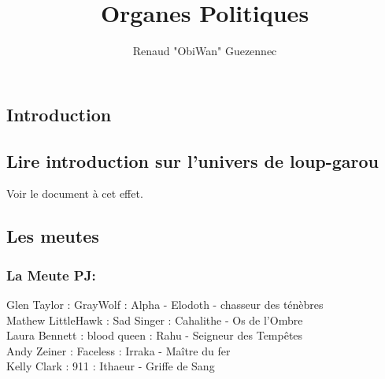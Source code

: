 \documentclass[oneside,12pt]{book}
\title{Organes Politiques}
\author{Renaud "ObiWan" Guezennec}
\date{}
\begin{document}
\maketitle \clearpage
\tableofcontents \clearpage

\begin{flushleft}
    \chapter{Introduction}
        \section{Lire introduction sur l'univers de loup-garou}
       Voir le document à cet effet.

\section{Les meutes}
\subsection{La Meute PJ: }
Glen Taylor : GrayWolf : Alpha - Elodoth - chasseur des ténèbres\\
Mathew LittleHawk : Sad Singer : Cahalithe - Os de l'Ombre \\
Laura Bennett : blood queen : Rahu - Seigneur des Tempêtes\\
Andy Zeiner : Faceless : Irraka - Maître du fer\\
Kelly Clark : 911 : Ithaeur - Griffe de Sang\\



\clearpage

\end{flushleft}
\end{document}
